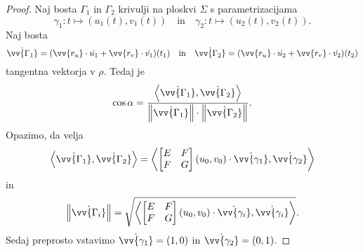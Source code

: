 \begin{proof}
Naj bosta $\Gamma_1$ in $\Gamma_2$ krivulji na ploskvi $\Sigma$ s
parametrizacijama
\[
\gamma_1 \colon t \mapsto (u_1(t), v_1(t))
\quad \text{in} \quad
\gamma_2 \colon t \mapsto (u_2(t), v_2(t)).
\]
Naj bosta
\[
\dot{\vv{\Gamma_1}} =
(\vv{r_u} \cdot \dot{u_1} + \vv{r_v} \cdot \dot{v_1})(t_1)
\quad \text{in} \quad
\dot{\vv{\Gamma_2}} =
(\vv{r_u} \cdot \dot{u_2} + \vv{r_v} \cdot \dot{v_2})(t_2)
\]
tangentna vektorja v $\rho$. Tedaj je
\[
\cos \alpha = \frac{\skl{\dot{\vv{\Gamma_1}}, \dot{\vv{\Gamma_2}}}}{\norm{\dot{\vv{\Gamma_1}}} \cdot \norm{\dot{\vv{\Gamma_2}}}}.
\]
Opazimo, da velja
\[
\skl{\dot{\vv{\Gamma_1}}, \dot{\vv{\Gamma_2}}} =
\skl{
\begin{bmatrix}
E & F \\
F & G
\end{bmatrix}
(u_0,v_0) \cdot \dot{\vv{\gamma_1}}, \dot{\vv{\gamma_2}}}
\]
in
\[
\norm{\dot{\vv{\Gamma_i}}} = \sqrt{\skl{
\begin{bmatrix}
E & F \\
F & G
\end{bmatrix}
(u_0,v_0) \cdot \dot{\vv{\gamma_i}}, \dot{\vv{\gamma_i}}}}.
\]
Sedaj preprosto vstavimo $\dot{\vv{\gamma_1}} = (1,0)$ in
$\dot{\vv{\gamma_2}} = (0,1)$.
\end{proof}

